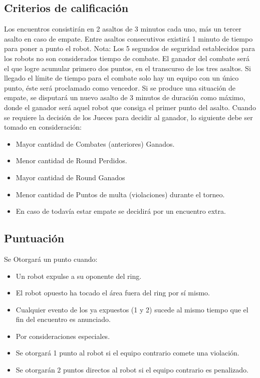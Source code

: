 \documentclass[12pt]{book}
\theoremstyle{definition}
\theoremstyle{remark}
\theoremstyle{plain}
\begin{document}
\subsection{Criterios de calificación}

Los encuentros consistirán en 2 asaltos de 3 minutos cada uno, más un tercer asalto en caso de empate. Entre asaltos 
consecutivos existirá 1 minuto de tiempo para poner a punto el robot. 
Nota: Los 5 segundos de seguridad establecidos para los robots no son considerados tiempo de combate. 
El ganador del combate será el que logre acumular primero dos puntos, en el transcurso de los tres asaltos. Si llegado 
el límite de tiempo para el combate solo hay un equipo con un único punto, éste será proclamado como vencedor. Si se produce
 una situación de empate, se disputará un nuevo asalto de 3 minutos de duración como máximo, donde el ganador será aquel 
robot que consiga el primer punto del asalto. 
Cuando se requiere la decisión de los Jueces para decidir al ganador, lo siguiente debe ser tomado en consideración: 
\begin{itemize}
 \item Mayor cantidad de Combates (anteriores) Ganados.
 \item Menor cantidad de Round Perdidos. 
 \item Mayor cantidad de Round Ganados 
 \item Menor cantidad de Puntos de multa (violaciones) durante el torneo. 
 \item En caso de todavía estar empate se decidirá por un encuentro extra.
\end{itemize}

\subsection{Puntuación}
Se Otorgará un punto cuando: 
\begin{itemize}
 \item Un robot expulse a su oponente del ring. 
 \item El robot opuesto ha tocado el área fuera del ring por sí mismo. 
 \item Cualquier evento de los ya expuestos (1 y 2) sucede al mismo tiempo que el fin del encuentro es anunciado. 
 \item Por consideraciones especiales. 
 \item Se otorgará 1 punto al robot si el equipo contrario comete una violación. 
 \item Se otorgarán 2 puntos directos al robot si el equipo contrario es penalizado.
\end{itemize}
\end{document}
